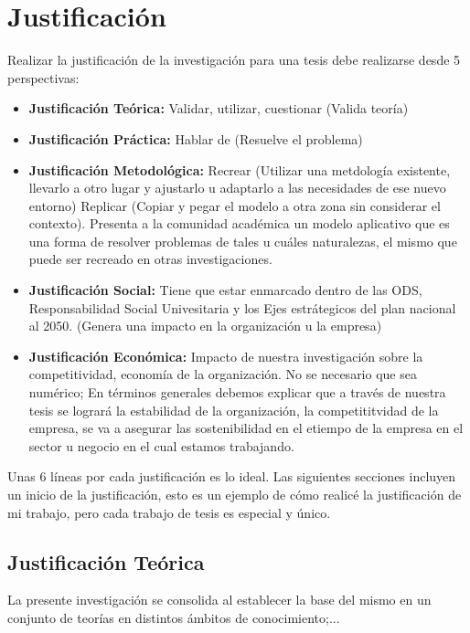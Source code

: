 \chapter{Justificación}
Realizar la justificación de la investigación para una tesis debe realizarse desde 5 perspectivas:

\begin{itemize}
    \item \textbf{Justificación Teórica:} Validar, utilizar, cuestionar (Valida teoría)
    \item \textbf{Justificación Práctica:} Hablar de (Resuelve el problema)
    \item \textbf{Justificación Metodológica:} Recrear (Utilizar una metdología existente, llevarlo a otro lugar y ajustarlo u adaptarlo a las necesidades de ese nuevo entorno) Replicar (Copiar y pegar el modelo a otra zona sin considerar el contexto). Presenta a la comunidad académica un modelo aplicativo que es una forma de resolver problemas de tales u cuáles naturalezas, el mismo que puede ser recreado en otras investigaciones.
    \item \textbf{Justificación Social:} Tiene que estar enmarcado dentro de las ODS, Responsabilidad Social Univesitaria y los Ejes estrátegicos del plan nacional al 2050. (Genera una impacto en la organización u la empresa)
    \item \textbf{Justificación Económica:} Impacto de nuestra investigación sobre la competitividad, economía de la organización. No se necesario que sea numérico; En términos generales debemos explicar que a través de nuestra tesis se logrará la estabilidad de la organización, la competititvidad de la empresa, se va a asegurar las sostenibilidad en el etiempo de la empresa en el sector u negocio en el cual estamos trabajando.
\end{itemize}

Unas 6 líneas por cada justificación es lo ideal. Las siguientes secciones incluyen un inicio de la justificación, esto es un ejemplo de cómo realicé la justificación de mi trabajo, pero cada trabajo de tesis es especial y único.

\section{Justificación Teórica}
    \begin{sectext}
        La presente investigación se consolida al establecer la base del mismo en un conjunto de teorías en distintos ámbitos de conocimiento;...
    \end{sectext}

